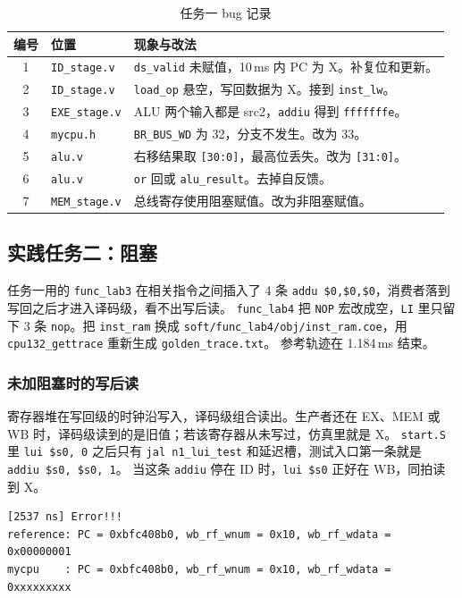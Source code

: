 \documentclass{article}
\begin{document}
\begin{table}[H]
  \centering
  \caption{任务一 bug 记录}
  \begin{tabular}{clp{7.4cm}}
    \toprule
    编号 & 位置 & 现象与改法 \\
    \midrule
    1 & \texttt{ID\_stage.v} & \texttt{ds\_valid} 未赋值，10\,ms 内 PC 为 X。补复位和更新。 \\
    2 & \texttt{ID\_stage.v} & \texttt{load\_op} 悬空，写回数据为 X。接到 \texttt{inst\_lw}。 \\
    3 & \texttt{EXE\_stage.v} & ALU 两个输入都是 src2，\texttt{addiu} 得到 \texttt{fffffffe}。 \\
    4 & \texttt{mycpu.h} & \texttt{BR\_BUS\_WD} 为 32，分支不发生。改为 33。 \\
    5 & \texttt{alu.v} & 右移结果取 \texttt{[30:0]}，最高位丢失。改为 \texttt{[31:0]}。 \\
    6 & \texttt{alu.v} & \texttt{or} 回或 \texttt{alu\_result}。去掉自反馈。 \\
    7 & \texttt{MEM\_stage.v} & 总线寄存使用阻塞赋值。改为非阻塞赋值。 \\
    \bottomrule
  \end{tabular}
\end{table}


\subsection{实践任务二：阻塞}
任务一用的 \texttt{func\_lab3} 在相关指令之间插入了 4 条 \texttt{addu \$0,\$0,\$0}，消费者落到写回之后才进入译码级，看不出写后读。
\texttt{func\_lab4} 把 \texttt{NOP} 宏改成空，\texttt{LI} 里只留下 3 条 \texttt{nop}。把 \texttt{inst\_ram} 换成
\texttt{soft/func\_lab4/obj/inst\_ram.coe}，用 \texttt{cpu132\_gettrace} 重新生成 \texttt{golden\_trace.txt}。
参考轨迹在 1.184\,ms 结束。

\subsubsection{未加阻塞时的写后读}
寄存器堆在写回级的时钟沿写入，译码级组合读出。生产者还在 EX、MEM 或 WB 时，译码级读到的是旧值；若该寄存器从未写过，仿真里就是 X。
\texttt{start.S} 里 \texttt{lui \$s0, 0} 之后只有 \texttt{jal n1\_lui\_test} 和延迟槽，测试入口第一条就是 \texttt{addiu \$s0, \$s0, 1}。
当这条 \texttt{addiu} 停在 ID 时，\texttt{lui \$s0} 正好在 WB，同拍读到 X。

\begin{verbatim}
[2537 ns] Error!!!
reference: PC = 0xbfc408b0, wb_rf_wnum = 0x10, wb_rf_wdata = 0x00000001
mycpu    : PC = 0xbfc408b0, wb_rf_wnum = 0x10, wb_rf_wdata = 0xxxxxxxxx
\end{verbatim}
\end{document}
